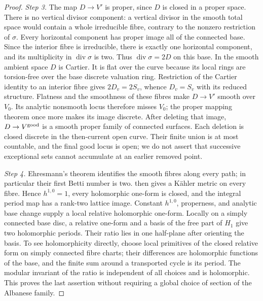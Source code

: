 \documentclass[11pt,a4paper]{article}
\theoremstyle{plain}
\theoremstyle{definition}
\begin{document}
\begin{proof}
\par\noindent\textit{Step 3.} The map \(D\to V'\) is proper, since \(D\) is closed in a proper
space. There is no vertical divisor component: a vertical divisor in
the smooth total space would contain a whole irreducible fibre,
contrary to the nonzero restriction of \(\sigma\). Every horizontal
component has proper image all of the connected base. Since the
interior fibre is irreducible, there is exactly one horizontal
component, and its multiplicity in \(\operatorname{div}\sigma\) is
two. Thus \(\operatorname{div}\sigma=2D\) on this base. In the smooth
ambient space \(D\) is Cartier. It is flat over the curve because
its local rings are torsion-free over the base discrete valuation
ring. Restriction of the Cartier identity to an interior fibre gives
\(2D_v=2S_v\), whence \(D_v=S_v\) with its reduced structure.
Flatness and the smoothness of these fibres make \(D\to V'\) smooth
over \(V_0\). Its analytic nonsmooth locus therefore misses \(V_0\);
the proper mapping theorem once more makes its image discrete.
After deleting that image, \(D\to V^{\rm good}\) is a smooth proper
family of connected surfaces. Each deletion is closed discrete in the
then-current open curve. Their finite union is at most countable,
and the final good locus is open; we do not assert that successive
exceptional sets cannot accumulate at an earlier removed point.

\par\noindent\textit{Step 4.} Ehresmann's theorem \cite[\S1, Proposition, pp.~154--155]{Ehresmann52} identifies the smooth fibres along every path;
in particular their first Betti number is two. \cite[Theorem~11]{Buchdahl1999} then gives a K\"ahler metric on every fibre. Hence
\(h^{1,0}=1\), every holomorphic one-form is closed, and the integral
period map has a rank-two lattice image. Constant \(h^{1,0}\),
properness, and analytic base change supply a local relative
holomorphic one-form. Locally on a simply connected
base disc, a relative one-form and a basis of the free part of
\(H_1\) give two holomorphic periods. Their ratio lies in one
half-plane after orienting the basis. To see holomorphicity directly,
choose local primitives of the closed relative form on simply
connected fibre charts; their differences are holomorphic functions
of the base, and the finite sum around a transported cycle is its
period. The modular invariant of the ratio is independent of all
choices and is holomorphic. This proves the last assertion without
requiring a global choice of section of the Albanese family.
\end{proof}
\end{document}
